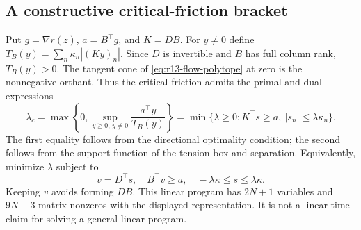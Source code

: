 \subsection{A constructive critical-friction bracket}\label{sec:r13-bracket}
Put $g=\nabla r(z)$, $a=B^\top g$, and $K=DB$. For $y\ne0$ define $T_B(y)=\sum_n\kappa_n|(Ky)_n|$. Since $D$ is invertible and $B$ has full column rank, $T_B(y)>0$. The tangent cone of \eqref{eq:r13-flow-polytope} at zero is the nonnegative orthant. Thus the critical friction admits the primal and dual expressions
\begin{equation}\label{eq:r13-critical}
 \lambda_c=\max\left\{0,\sup_{y\geq0,\,y\ne0}\frac{a^\top y}{T_B(y)}\right\}
 =\min\{\lambda\geq0:K^\top s\geq a,\ |s_n|\leq\lambda\kappa_n\}.
\end{equation}
The first equality follows from the directional optimality condition; the second follows from the support function of the tension box and separation. Equivalently, minimize $\lambda$ subject to
\[
 v=D^\top s,\quad B^\top v\geq a,\quad -\lambda\kappa\leq s\leq\lambda\kappa.
\]
Keeping $v$ avoids forming $DB$. This linear program has $2N+1$ variables and $9N-3$ matrix nonzeros with the displayed representation. It is not a linear-time claim for solving a general linear program.

